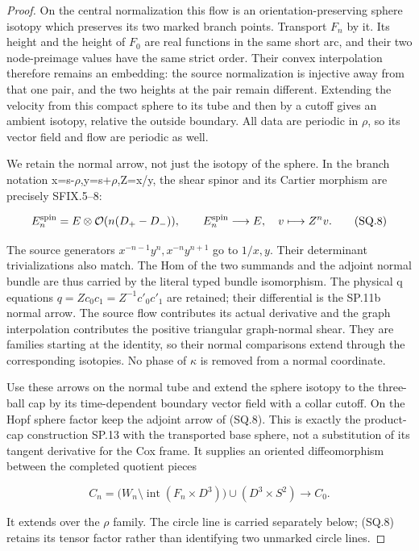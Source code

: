 \begin{proof}
On the central normalization this flow is an orientation-preserving
sphere isotopy which preserves its two marked branch points. Transport
\(F_{n}\) by it. Its height and the height of \(F_{0}\) are real functions in the
same short arc, and their two node-preimage values have the same strict
order. Their convex interpolation therefore remains an embedding:
the source normalization is injective away from that one pair, and
the two heights at the pair remain different. Extending the velocity
from this compact sphere to its tube and then by a cutoff gives an
ambient isotopy, relative the outside boundary. All data are periodic
in \(\rho\), so its vector field and flow are periodic as well.

We retain the normal arrow, not just the isotopy of the sphere. In
the branch notation x=s-\(\rho\),y=s+\(\rho\),Z=x/y, the shear spinor and its
Cartier morphism are precisely SFIX.5--8:

\[
 E_n^{\rm spin}=E\otimes\mathcal O(n(D_+-D_-)),\qquad
       E_n^{\rm spin}\longrightarrow E,\quad v\longmapsto Z^n v.
                                                        \tag{SQ.8}
\]

The source generators \(x^{-n-1}y^n,x^{-n}y^{n+1}\) go to \(1/x,y\).
Their determinant trivializations also match. The Hom of the two
summands and the adjoint normal bundle are thus carried by the
literal typed bundle isomorphism. The physical q equations
\(q=Zc_0c_1=Z^{-1}c'_0c'_1\) are retained; their differential is the
SP.11b normal arrow. The source flow contributes its actual derivative
and the graph interpolation contributes the positive triangular
graph-normal shear. They are families starting at the identity, so
their normal comparisons extend through the corresponding isotopies.
No phase of \(\kappa\) is removed from a normal coordinate.

Use these arrows on the normal tube and extend the sphere isotopy to
the three-ball cap by its time-dependent boundary vector field with
a collar cutoff. On the Hopf sphere factor keep the adjoint arrow
of (SQ.8). This is exactly the product-cap construction SP.13 with
the transported base sphere, not a substitution of its tangent
derivative for the Cox frame. It supplies an oriented diffeomorphism
between the completed quotient pieces

\[
 C_n=\bigl(W_n\setminus\operatorname{int}(F_n\times D^3)\bigr)
                      \cup(D^3\times S^2)
                 \longrightarrow C_0 .                 \tag{SQ.9}
\]

It extends over the \(\rho\) family. The circle line is carried separately
below; (SQ.8) retains its tensor factor rather than identifying two
unmarked circle lines.


\end{proof}
